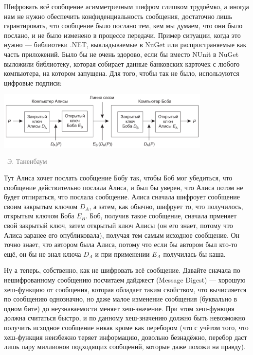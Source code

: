 \documentclass[a5paper]{article}
\newcommand{\attribution}[1] {
\vspace{-5mm}\begin{flushright}\begin{scriptsize}\textcolor{gray}{\textcopyright\, #1}\end{scriptsize}\end{flushright}
}
\begin{document}
Шифровать всё сообщение асимметричным шифром слишком трудоёмко, а иногда нам не нужно обеспечить конфиденциальность сообщения, достаточно лишь гарантировать, что сообщение было послано тем, кем мы думаем, что они было послано, и не было изменено в процессе передачи. Пример ситуации, когда это нужно --- библиотеки .NET, выкладываемые в NuGet или распространяемые как часть приложений. Было бы не очень здорово, если бы вместо NUnit в NuGet выложили библиотеку, которая собирает данные банковских карточек с любого компьютера, на котором запущена. Для того, чтобы так не было, используются цифровые подписи:

\begin{center}
    \includegraphics[width=0.8\textwidth]{signature.png}
    \attribution{Э. Таненбаум}
\end{center}

Тут Алиса хочет послать сообщение Бобу так, чтобы Боб мог убедиться, что сообщение действительно послала Алиса, и был бы уверен, что Алиса потом не будет отпираться, что послала сообщение. Алиса сначала шифроует сообщение своим закрытым ключом $D_A$, а затем, как обычно, шифрует то, что получилось, открытым ключом Боба $E_B$. Боб, получив такое сообщение, сначала прменяет свой закрытый ключ, затем открытый ключ Алисы (он его знает, потому что Алиса заранее его опубликовала), получая тем самым исходное сообщение. Он точно знает, что автором была Алиса, потому что если бы автором был кто-то ещё, он бы не знал ключа $D_A$ и при применении $E_A$ получилась бы каша. 

Ну а теперь, собственно, как не шифровать всё сообщение. Давайте сначала по нешифрованному сообщению посчитаем дайджест (Message Digest) --- хорошую хеш-функцию от сообщения, которая обладает таким свойством, что вычисляется по сообщению однозначно, но даже малое изменение сообщения (буквально в одном бите) до неузнаваемости меняет хеш-значение. При этом хеш-функция должна считаться быстро, и по данному хеш-значению должно быть невозможно получить исходное сообщение никак кроме как перебором (что с учётом того, что хеш-функция неизбежно теряет информацию, довольно безнадёжно, перебор даст лишь пару миллионов подходящих сообщений, которые даже похожи на правду). 
\end{document}
